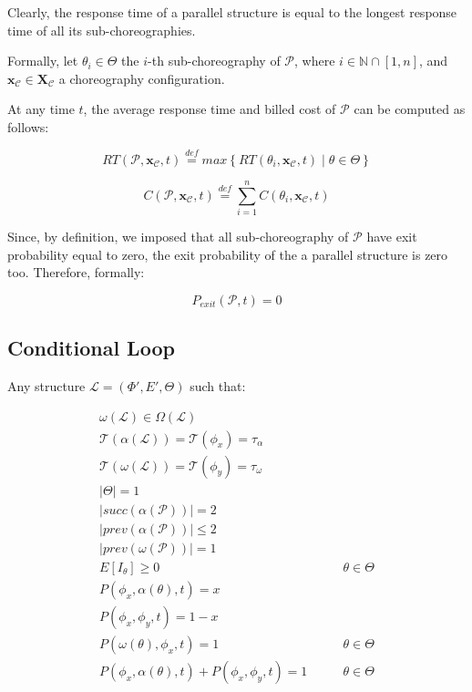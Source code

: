 \documentclass[12pt,a4paper]{report}
\newcommand{\mathDef}{\overset{\textit{def}}{=}}
\newcommand{\N}{\mathbb{N}}
\begin{document}
Clearly, the response time of a parallel structure is equal to the longest response time of all its sub-choreographies.

Formally, let $\theta_i \in \Theta$ the $i$-th sub-choreography of $\mathcal{P}$, where $i \in \N \cap \left[1,n\right]$, and $\textbf{x}_{\mathcal{C}} \in \textbf{X}_{\mathcal{C}}$ a choreography configuration.

At any time $t$, the average response time and billed cost of $\mathcal{P}$ can be computed as follows:

\begin{equation}
	RT(\mathcal{P},\textbf{x}_{\mathcal{C}}, t) \mathDef max \left\lbrace RT(\theta_i,\textbf{x}_{\mathcal{C}}, t) \mid \theta \in \Theta \right\rbrace 
\end{equation}

\begin{equation}
	C(\mathcal{P},\textbf{x}_{\mathcal{C}}, t) \mathDef \sum_{i = 1}^n C(\theta_i,\textbf{x}_{\mathcal{C}}, t)
\end{equation}

Since, by definition, we imposed that all sub-choreography of $\mathcal{P}$ have exit probability equal to zero, the exit probability of the a parallel structure is zero too. Therefore, formally:

\begin{equation}
	P_{exit}(\mathcal{P}, t) = 0
\end{equation}

\subsection{Conditional Loop}

Any structure $\mathcal{L} = (\Phi',E',\Theta)$ such that:

\begin{eqnarray}
	\omega(\mathcal{L}) \in \Omega(\mathcal{L}) \\
	\mathscr{T}(\alpha(\mathcal{L})) = \mathscr{T}(\phi_x) = \tau_{\alpha} \\ \mathscr{T}(\omega(\mathcal{L})) = \mathscr{T}(\phi_y) = \tau_{\omega} \\
	|\Theta| = 1  & \\
	|succ(\alpha(\mathcal{P}))| = 2 \\
	|prev(\alpha(\mathcal{P}))| \leq 2 \\
	|prev(\omega(\mathcal{P}))| = 1 \\
	E[I_{\theta}] \geq 0 & \qquad \theta \in \Theta \\
	P(\phi_{x}, \alpha(\theta), t) = x & \\
	P(\phi_{x}, \phi_{y},t) = 1 - x & \\
	P(\omega(\theta), \phi_{x},t) = 1 & \qquad \theta \in \Theta \\
	P(\phi_x, \alpha(\theta),t) + P(\phi_{x}, \phi_{y},t) = 1 & \qquad \theta \in \Theta
\end{eqnarray}
\end{document}

